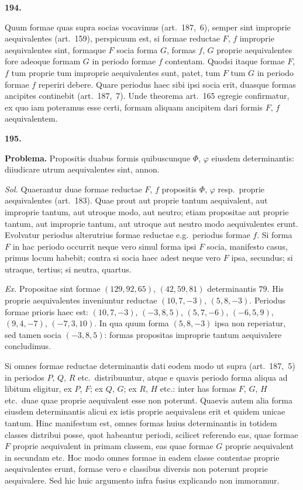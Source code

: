 \documentclass[12pt,a4paper]{article}
\theoremstyle{plain}
\begin{document}
\textbf{194.}

Quum formae quas supra socias vocavimus (art.~187,~6), semper sint improprie aequivalentes (art.~159), perspicuum est, si formae reductae $F$, $f$ improprie aequivalentes sint, formaque $F$ socia forma $G$, formas $f$, $G$ proprie aequivalentes fore adeoque formam $G$ in periodo formae $f$ contentam. Quodsi itaque formae $F$, $f$ tum proprie tum improprie aequivalentes sunt, patet, tum $F$ tum $G$ in periodo formae $f$ reperiri debere. Quare periodus haec sibi ipsi socia erit, duasque formas ancipites continebit (art.~187,~7). Unde theorema art.~165 egregie confirmatur, ex quo iam poteramus esse certi, formam aliquam ancipitem dari formis $F$, $f$ aequivalentem.

\bigskip

\textbf{195.}

\textbf{Problema.} Propositis duabus formis quibuscunque $\Phi$, $\varphi$ eiusdem determinantis: diiudicare utrum aequivalentes sint, annon.

\textit{Sol.} Quaerantur duae formae reductae $F$, $f$ propositis $\Phi$, $\varphi$ resp.~proprie aequivalentes (art.~183). Quae prout aut proprie tantum aequivalent, aut improprie tantum, aut utroque modo, aut neutro; etiam propositae aut proprie tantum, aut improprie tantum, aut utroque aut neutro modo aequivalentes erunt. Evolvatur periodus alterutrius formae reductae e.g.~periodus formae $f$. Si forma $F$ in hac periodo occurrit neque vero simul forma ipsi $F$ socia, manifesto casus, primus locum habebit; contra si socia haec adest neque vero $F$ ipsa, secundus; si utraque, tertius; si neutra, quartus.

\textit{Ex.} Propositae sint formae $(129, 92, 65)$, $(42, 59, 81)$ determinantis $79$. His proprie aequivalentes inveniuntur reductae $(10, 7, -3)$, $(5, 8, -3)$. Periodus formae prioris haec est: $(10, 7, -3)$, $(-3, 8, 5)$, $(5, 7, -6)$, $(-6, 5, 9)$, $(9, 4, -7)$, $(-7, 3, 10)$. In qua quum forma $(5, 8, -3)$ ipsa non reperiatur, sed tamen socia $(-3, 8, 5)$: formas propositas improprie tantum aequivalere concludimus.

Si omnes formae reductae determinantis dati eodem modo ut supra (art.~187,~5) in periodos $P$, $Q$, $R$ etc.~distribuuntur, atque e quavis periodo forma aliqua ad libitum eligitur, ex $P$, $F$; ex $Q$, $G$; ex $R$, $H$ etc.: inter has formas $F$, $G$, $H$ etc.~duae quae proprie aequivalent esse non poterunt. Quaevis autem alia forma eiusdem determinantis alicui ex istis proprie aequivalens erit et quidem unicae tantum. Hinc manifestum est, omnes formas huius determinantis in totidem classes distribui posse, quot habeantur periodi, scilicet referendo eas, quae formae $F$ proprie aequivalent in primam classem, eas quae formae $G$ proprie aequivalent in secundam etc. Hoc modo omnes formae in eadem classe contentae proprie aequivalentes erunt, formae vero e classibus diversis non poterunt proprie aequivalere. Sed hic huic argumento infra fusius explicando non immoramur.
\end{document}
